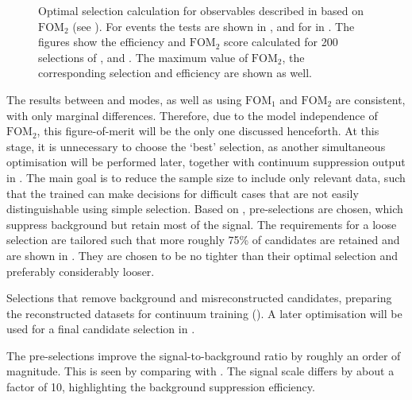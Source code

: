 \begin{figure}[htbp!]
{        }
    \caption{\label{fig:selection_optimisations} Optimal selection calculation for observables
    described in  based on $\mathrm{FOM}_2$ (see ).
    For \BptoXsgamma events the tests are shown
    in ,
    and for \BztoXsgamma in .
    The figures show the efficiency and $\mathrm{FOM}_2$ score calculated for 200 selections of \piVeto, \etaVeto and \ZMVA.
    The maximum value of $\mathrm{FOM}_2$, the corresponding selection and efficiency are shown as well.
    }
\end{figure}

The results between \Bp and \Bz modes, as well as using $\mathrm{FOM}_1$ and $\mathrm{FOM}_2$ are consistent, with only marginal differences.
Therefore, due to the model independence of $\mathrm{FOM}_2$, this figure-of-merit will be the only one discussed henceforth.
At this stage, it is unnecessary to choose the `best' selection, 
as another simultaneous optimisation will be performed later, together with continuum suppression \BDT output in .
The main goal is to reduce the sample size to include only relevant data, such that the trained \BDT can make decisions for difficult cases that are not easily distinguishable using simple selection.
Based on , pre-selections are chosen, which suppress background but retain most of the signal.
The requirements for a loose selection are tailored such that more roughly 75\% of \BtoXsgamma candidates are retained and are shown in .
They are chosen to be no tighter than their optimal selection and preferably considerably looser.

\begin{table}[htbp!]
    \centering
    \caption{\label{tab:preselections} Selections that remove background and misreconstructed candidates,
    preparing the reconstructed datasets  for continuum \BDT training ().
    A later optimisation will be used for a final candidate selection in .
    }
    
\end{table}

The pre-selections improve the signal-to-background ratio by roughly an order of magnitude.
This is seen by comparing  with .
The \BtoXsgamma signal \MC scale differs by about a factor of 10, highlighting the background suppression efficiency.

